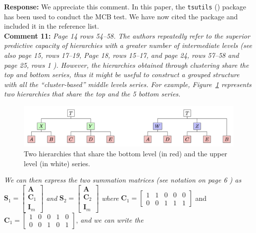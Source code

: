 \documentclass{article}
\numberwithin{equation}{section}
\theoremstyle{plain}
\theoremstyle{definition}
\theoremstyle{remark}
\let\code=\texttt
\begin{document}
\medskip

\noindent \textbf{Response:} {We appreciate this comment. In this paper, the \code{tsutils} (\citealp{tsuitls}) package has been used to conduct the MCB test. We have now cited the package and included it in the reference list. } \\


\textbf{Comment 11:} \textit{Page 14 rows 54--58. The authors repeatedly refer to the superior predictive capacity of hierarchies with a greater number of intermediate levels (see also page 15, rows 17--19, Page 18, rows 15--17, and page 24, rows 57--58 and page 25, rows 1 ). However, the hierarchies obtained through clustering share the top and bottom series, thus it might be useful to construct a grouped structure with all the ``cluster-based'' middle levels series. For example, Figure~\ref{fig:comment_fig} represents two hierarchies that share the top and the 5 bottom series.}

\begin{figure}[h!]
\centering
\includegraphics[width=\textwidth]{figures/comment_figure.png}
\caption{\label{fig:comment_fig}Two hierarchies that share the bottom level (in red) and the upper level (in white) series.}
\end{figure}
\vspace{-0.5cm}
\textit{We can then express the two summation matrices (see notation on page 6 ) as}
$\boldsymbol{S}_1=\left[\begin{matrix}\boldsymbol{A}\\\boldsymbol{C}_1\\\boldsymbol{I}_m\end{matrix}\right]$ \textit{and} $\boldsymbol{S}_2=\left[\begin{matrix}\boldsymbol{A}\\\boldsymbol{C}_2\\\boldsymbol{I}_m\end{matrix}\right]$ \textit{where} $\boldsymbol{C}_1=\left[\begin{matrix}
    1 & 1 & 0 & 0 & 0 \\
    0 & 0 & 1 & 1 & 1
\end{matrix}\right]$ and $\boldsymbol{C}_1=\left[\begin{matrix}
    1 & 0 & 0 & 1 & 0 \\
    0 & 0 & 1 & 0 & 1
\end{matrix}\right]$,
\textit{and we can write the} \\
\end{document}
